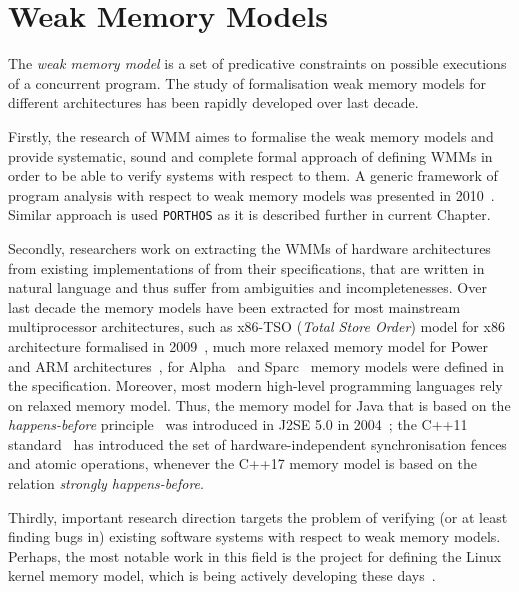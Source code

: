 \chapter{Weak Memory Models}
\label{ch:wmm}

The \textit{weak memory model} is a set of predicative constraints on possible executions of a concurrent program. The study of formalisation weak memory models for different architectures has been rapidly developed over last decade. 

Firstly, the research of WMM aimes to formalise the weak memory models and provide systematic, sound and complete formal approach of defining WMMs in order to be able to verify systems with respect to them.
A generic framework of program analysis with respect to weak memory models was presented in 2010~\cite{alglave2010shared}. Similar approach is used \texttt{PORTHOS} as it is described
further in current Chapter.

Secondly, researchers work on extracting the WMMs of hardware architectures from existing implementations of from their specifications, that are written in natural language and thus suffer from ambiguities and incompletenesses. Over last decade the memory models have been extracted for most mainstream multiprocessor architectures, such as x86-TSO (\textit{Total Store Order}) model for x86 architecture formalised in 2009~\cite{owens2009better}, much more relaxed memory model for Power and ARM architectures~\cite{alglave2009semantics,sarkar2011understanding}, for Alpha~\cite{?} and Sparc~\cite{?} memory models were defined in the specification. Moreover, most modern high-level programming languages rely on relaxed memory model. Thus, the memory model for Java that is based on the \textit{happens-before} principle~\cite{lamport1978time} was introduced in J2SE 5.0 in 2004~\cite{manson2005java}; the C++11 standard~\cite{?} has introduced the set of hardware-independent synchronisation fences and atomic operations, whenever the C++17 memory model is based on the relation \textit{strongly happens-before}.

Thirdly, important research direction targets the problem of verifying (or at least finding bugs in) existing software systems with respect to weak memory models. Perhaps, the most notable work in this field is the project for defining the Linux kernel memory model, which is being actively developing these days~\cite{kernel1}.

